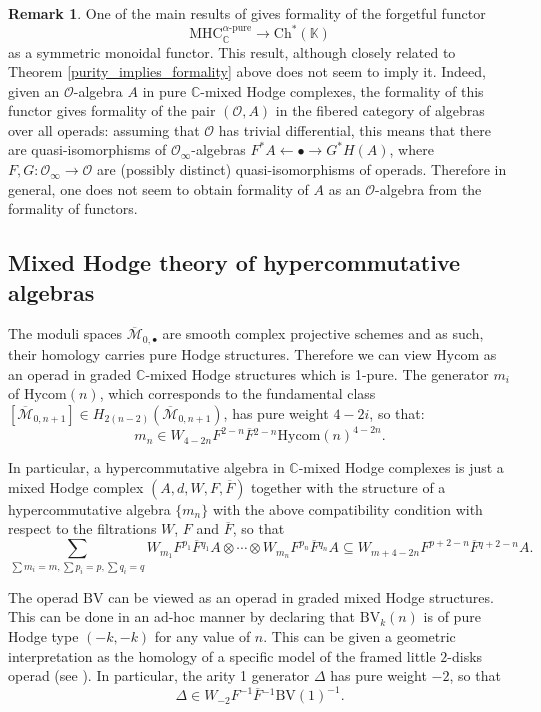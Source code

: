 \documentclass[a4paper]{amsart}
\theoremstyle{definition}
\newtheorem{rema}[theo]{Remark}
\theoremstyle{theorem}
\newcommand{\CC}{\mathbb{C}}
\newcommand{\KK}{\mathbb{K}}
\newcommand{\Mm}{\mathcal{M}}
\newcommand{\Oo}{\mathcal{O}}
\newcommand{\ov}{\overline}
\newcommand{\lra}{\longrightarrow}
\newcommand{\ch}[1]{\mathrm{Ch^*({#1})}}
\newcommand{\MHC}{{\mathrm{MHC}}}
\newcommand{\BV}{{\mathrm{BV}}}
\begin{document}
\begin{rema}
One of the main results of \cite{CiHo} gives formality of the forgetful functor 
 \[\MHC_{\CC}^{\alpha\text{-pure}}\lra \ch{\KK}\]
 as a symmetric monoidal functor. This result, although closely related to Theorem \ref{purity_implies_formality} above does not seem to imply it. Indeed, given an $\Oo$-algebra $A$ in pure $\CC$-mixed Hodge complexes, the formality of this functor gives formality 
 of the pair $(\Oo,A)$ in the fibered category of algebras over all operads: assuming that $\Oo$ has trivial differential, this means that there are 
 quasi-isomorphisms of $\Oo_\infty$-algebras $F^*A\leftarrow \bullet\rightarrow G^*H(A)$, where $F,G:\Oo_\infty\to \Oo$ are (possibly distinct) quasi-isomorphisms of operads. Therefore in general, one does not seem to obtain formality of $A$ as an $\Oo$-algebra from the formality of functors.
\end{rema}

\subsection{Mixed Hodge theory of hypercommutative algebras}\label{HycomMHS}


The moduli spaces $\ov{\Mm}_{0,\bullet}$ are smooth complex projective schemes and as such, their homology carries pure Hodge structures.
Therefore we can view $\mathrm{Hycom}$ as an operad in graded $\CC$-mixed Hodge structures which is 1-pure.
The generator $m_i$ of $\mathrm{Hycom}(n)$, which corresponds to the fundamental class $[\ov{\Mm}_{0,n+1}]\in H_{2(n-2)}(\ov{\Mm}_{0,n+1})$, has pure weight $4-2i$, so that:
\[m_n\in W_{4-2n} F^{2-n}\ov {F}{}^{2-n}\mathrm{Hycom}(n)^{4-2n}.\]

In particular, a hypercommutative algebra in $\CC$-mixed Hodge complexes is just a mixed Hodge complex $(A,d,W,F,\ov F)$ together with the structure of a hypercommutative algebra $\{m_n\}$ with the above compatibility condition with respect to the filtrations $W$, $F$ and $\ov F$, so that 
\[\sum_{\sum m_i=m,\sum p_i=p, \sum q_i=q}W_{m_1}F^{p_1}\ov {F}{}^{q_1}A \otimes \cdots\otimes W_{m_n}F^{p_n}\ov {F}{}^{q_n}A\subseteq W_{m+4-2n} F^{p+2-n}\ov {F}{}^{q+2-n}A.\]


The operad $\BV$ can be viewed as an operad in graded mixed Hodge structures. This can be done in an ad-hoc manner by declaring that $\BV_k(n)$ is of pure Hodge type $(-k,-k)$ for any value of $n$. This can be given a geometric interpretation as the homology of a specific model of the framed little $2$-disks operad (see \cite{Vaintrob}). In particular, the arity 1 generator $\Delta$ has pure weight $-2$, so that 
\[\Delta\in W_{-2} F^{-1}\ov{F}{}^{-1}\mathrm{BV}(1)^{-1}.\]
\end{document}

